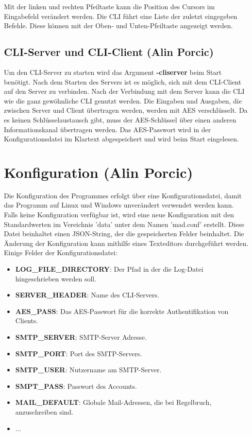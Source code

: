 \documentclass[12pt,a4paper]{report}
\begin{document}
\begin{onehalfspace}
Mit der linken und rechten Pfeiltaste kann die Position des Cursors im Eingabefeld verändert werden. Die CLI führt eine Liste der zuletzt eingegeben Befehle. Diese können mit der Oben- und Unten-Pfeiltaste angezeigt werden.

\section{CLI-Server und CLI-Client (Alin Porcic)}

Um den CLI-Server zu starten wird das Argument \textbf{-cliserver} beim Start benötigt. Nach dem Starten des Servers ist es möglich, sich mit dem CLI-Client auf den Server zu verbinden. Nach der Verbindung mit dem Server kann die CLI wie die ganz gewöhnliche CLI genutzt werden. Die Eingaben und Ausgaben, die zwischen Server und Client übertragen werden, werden mit AES verschlüsselt. Da es keinen Schlüsselaustausch gibt, muss der AES-Schlüssel über einen anderen Informationskanal übertragen werden. Das AES-Passwort wird in der Konfigurationsdatei im Klartext abgespeichert und wird beim Start eingelesen.

\chapter{Konfiguration (Alin Porcic)}

Die Konfiguration des Programmes erfolgt über eine Konfigurationsdatei, damit das Programm auf Linux und Windows unverändert verwendet werden kann. Falls keine Konfiguration verfügbar ist, wird eine neue Konfiguration mit den Standardwerten im Vereichnis 'data' unter dem Namen 'mad.conf' erstellt. Diese Datei  beinhaltet einen JSON-String, der die gespeicherten Felder beinhaltet. Die Änderung der Konfiguration kann mithilfe eines Texteditors durchgeführt werden. Einige Felder der Konfigurationsdatei:

\begin{itemize}
\item \textbf{LOG\_FILE\_DIRECTORY}: Der Pfad in der die Log-Datei hingeschrieben werden soll.
\item \textbf{SERVER\_HEADER}: Name des CLI-Servers.
\item \textbf{AES\_PASS}: Das AES-Passwort für die korrekte Authentifikation von Clients.
\item \textbf{SMTP\_SERVER}: SMTP-Server Adresse.
\item \textbf{SMTP\_PORT}: Port des SMTP-Servers.
\item \textbf{SMTP\_USER}: Nutzername am SMTP-Server.
\item \textbf{SMPT\_PASS}: Passwort des Accounts.
\item \textbf{MAIL\_DEFAULT}: Globale Mail-Adressen, die bei Regelbruch, anzuschreiben sind.
\item ...
\end{itemize}


\end{onehalfspace}
\end{document}
